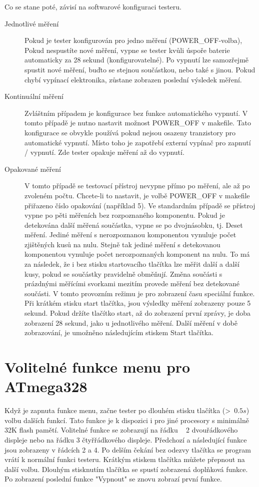 Co se stane poté, závisí na softwarové konfiguraci testeru.
\begin{description}
  \item[Jednotlivé měření] Pokud je tester konfigurován pro jedno měření (POWER\_OFF-volba),
Pokud nespustíte nové měření, vypne se tester kvůli úspoře baterie automaticky za 28 sekund (konfigurovatelné).
Po vypnutí lze samozřejmě spustit nové měření, buďto se stejnou součástkou, nebo také s jinou.
Pokud chybí vypínací elektronika, zůstane zobrazen poslední výsledek měření.
\vspace{-0.3cm}
  \item[Kontinuální měření]  Zvláštním případem je konfigurace bez funkce automatického vypnutí.
V tomto případě je nutno nastavit možnost POWER\_OFF v makefile.
Tato konfigurace se obvykle používá pokud nejsou osazeny tranzistory pro automatické vypnutí.
Místo toho je zapotřebí externí vypínač pro zapnutí / vypnutí. Zde tester opakuje měření až do vypnutí.
\vspace{-0.3cm}
  \item[Opakované měření] V tomto případě se testovací přístroj nevypne přímo po měření, ale až po zvoleném počtu. Chcete-li to nastavit, je volbě POWER\_OFF v makefile přiřazeno číslo
opakování (například 5).
Ve standardním případě se přístroj vypne po pěti měřeních bez rozpoznaného komponentu.
Pokud je detekována další měřená součástka, vypne se po dvojnásobku, tj. Deset měření.
Jediné měření s nerozpoznanou komponentou vynuluje počet zjištěných kusů na nulu.
Stejně tak jediné měření s detekovanou komponentou vynuluje počet nerozpoznaných komponent na nulu.
To má za následek, že i bez stisku startovacího tlačítka lze měřit další a další kusy,
  pokud se součástky pravidelně obměňují.
Změna součásti s prázdnými měřícími svorkami mezitím provede měření bez detekované součásti.
V tomto provozním režimu je pro zobrazení času speciální funkce. Při krátkém stisku start tlačítka, jsou výsledky měření zobrazeny pouze 5 sekund. Pokud držíte tlačítko start, až do zobrazení první zprávy,
je doba zobrazení 28 sekund, jako u jednotlivého měření. Další měření v době zobrazování, je umožněno následujícím stiskem Start tlačítka.
\end{description}

\section{Volitelné funkce menu pro ATmega328}
\vspace{-0.3cm}
Když je zapnuta funkce menu, začne tester po dlouhém stisku tlačítka (\textgreater~\(0.5s\)) volbu dalších funkcí.
Tato funkce je k dispozici i pro jiné procesory s minimálně 32K flash pamětí.
Volitelné funkce se zobrazují na řádku ~ 2 dvouřádkového displeje nebo na řádku 3 čtyřřádkového displeje. Předchozí a následující funkce jsou zobrazeny v řádcích 2 a 4.
Po delším čekání bez odezvy tlačítka se program vrátí k normální funkci testeru.
Krátkým stiskem tlačítka můžete přepnout na další volbu.
Dlouhým stisknutím tlačítka se spustí zobrazená doplňková funkce.
Po zobrazení poslední funkce "Vypnout" se znovu zobrazí první funkce.

